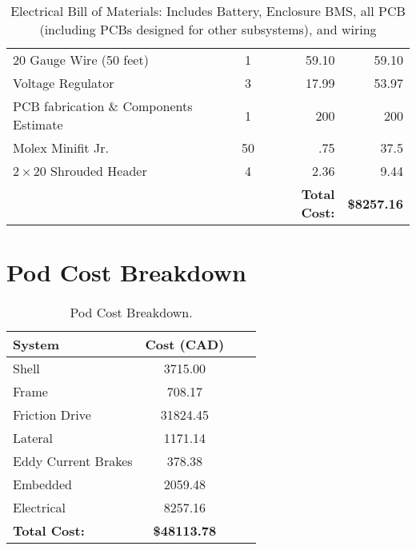 \documentclass[main.tex]{subfiles}
\begin{document}
\begin{table}[H]
\begin{tabular}{@{}lcrr@{}}
        20 Gauge Wire (50 feet)& 1 & 59.10 & 59.10 \\
        Voltage Regulator& 3 & 17.99 & 53.97 \\
        PCB fabrication \& Components Estimate& 1 & 200 & 200 \\
        Molex Minifit Jr. & 50 & .75 & 37.5 \\
        $2\times 20$ Shrouded Header& 4 & 2.36 & 9.44 \\
        \midrule
        &  &  \textbf{Total Cost:} & \textbf{\$8257.16} \\ \bottomrule
      \end{tabular}
      \caption{Electrical Bill of Materials: Includes Battery, Enclosure BMS, all PCB (including PCBs designed for other subsystems), and wiring}
      \label{tab:electrical-bom}
\end{table}

\section{Pod Cost Breakdown}
\begin{table}[H]
  	  \centering
      \begin{tabular}{@{}lcrr@{}} \toprule
        System & Cost (CAD) \\ \midrule
        Shell & 3715.00 \\
        Frame & 708.17 \\
        Friction Drive & 31824.45 \\
        Lateral & 1171.14 \\
        Eddy Current Brakes & 378.38 \\
        Embedded & 2059.48 \\
        Electrical & 8257.16 \\ \midrule
        \textbf{Total Cost:} & \textbf{\$48113.78} \\ \bottomrule
      \end{tabular}
      \caption{Pod Cost Breakdown.}
      \label{tab:pod-bom}
\end{table}
\end{document}
